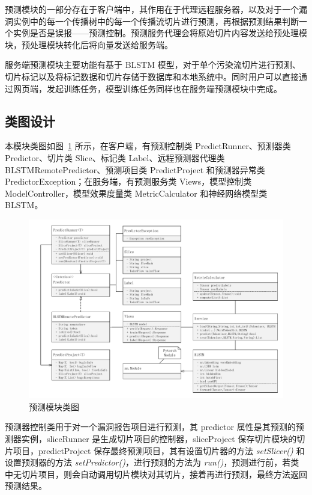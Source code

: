 预测模块的一部分存在于客户端中，其作用在于代理远程服务器，以及对于一个漏洞实例中的每一个传播树中的每一个传播流切片进行预测，再根据预测结果判断一个实例是否是误报——预测控制。预测服务代理会将原始切片内容发送给预处理模块，预处理模块转化后将向量发送给服务端。

服务端预测模块主要功能有基于 BLSTM 模型，对于单个污染流切片进行预测、切片标记以及将标记数据和切片存储于数据库和本地系统中。同时用户可以直接通过网页端，发起训练任务，模型训练任务同样也在服务端预测模块中完成。\\

\subsection{类图设计}

本模块类图如图~\ref{predictClass} 所示，在客户端，有预测控制类 PredictRunner、预测器类 Predictor、切片类 Slice、标记类 Label、远程预测器代理类 BLSTMRemotePredictor、预测项目类 PredictProject 和预测器异常类 PredictorException；在服务端，有预测服务类 Views，模型控制类 ModelController，模型效果度量类 MetricCalculator 和神经网络模型类 BLSTM。

\begin{figure}[!htbp]
    \centering
    \includegraphics[width=0.9\linewidth]{FIGs/chapter3/predictClass.pdf}
    \caption{预测模块类图}\label{predictClass}
\end{figure}

预测器控制类用于对一个漏洞报告项目进行预测，其 predictor 属性是其预测的预测器实例，sliceRunner 是生成切片项目的控制器，sliceProject 保存切片模块的切片项目，predictProject 保存最终预测项目，其有设置切片器的方法 \textit{setSlicer()} 和设置预测器的方法 \textit{setPredictor()}，进行预测的方法为 \textit{run()}，预测进行前，若类中无切片项目，则会自动调用切片模块对其切片，接着再进行预测，最终方法返回预测结果。

